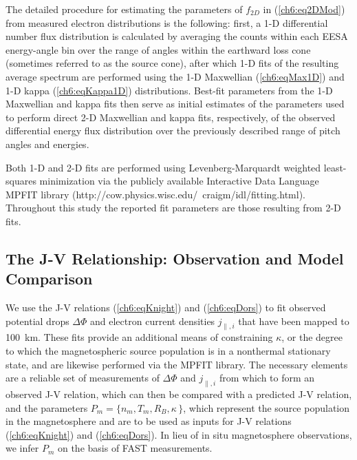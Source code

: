   The detailed procedure for estimating the parameters of $f_{2D}$ in
  (\ref{ch6:eq2DMod}) from measured electron distributions is the following:
  first, a 1-D differential number flux distribution is calculated by averaging
  the counts within each EESA energy-angle bin over the range of angles within
  the earthward loss cone (sometimes referred to as the source cone), after
  which 1-D fits of the resulting average spectrum are performed using the 1-D
  Maxwellian (\ref{ch6:eqMax1D}) and 1-D kappa (\ref{ch6:eqKappa1D})
  distributions. Best-fit parameters from the 1-D Maxwellian and kappa fits then
  serve as initial estimates of the parameters used to perform direct 2-D
  Maxwellian and kappa fits, respectively, of the observed differential energy
  flux distribution over the previously described range of pitch angles and
  energies. 

  Both 1-D and 2-D fits are performed using Levenberg-Marquardt weighted
  least-squares minimization via the publicly available Interactive Data
  Language MPFIT library
  (http://cow.physics.wisc.edu/~craigm/idl/fitting.html). Throughout this study
  the reported fit parameters are those resulting from 2-D fits.

  \subsection{The J-V Relationship: Observation and Model Comparison} \label{ssJV}

  We use the J-V relations (\ref{ch6:eqKnight}) and (\ref{ch6:eqDors}) to fit
  observed potential drops $\Delta \Phi$ and electron current densities
  $j_{\parallel,i}$ that have been mapped to 100~km. These fits provide an
  additional means of constraining $\kappa$, or the degree to which the
  magnetospheric source population is in a nonthermal stationary state, and are
  likewise performed via the MPFIT library. The necessary elements are a
  reliable set of measurements of $\Delta \Phi$ and $j_{\parallel,i}$ from which
  to form an observed J-V relation, which can then be compared with a predicted
  J-V relation, and the parameters $P_m = \{ n_m, T_m, R_B, \kappa \, \}$, which
  represent the source population in the magnetosphere and are to be used as
  inputs for J-V relations (\ref{ch6:eqKnight}) and (\ref{ch6:eqDors}). In lieu
  of in situ magnetosphere observations, we infer $P_m$ on the basis of FAST
  measurements.

